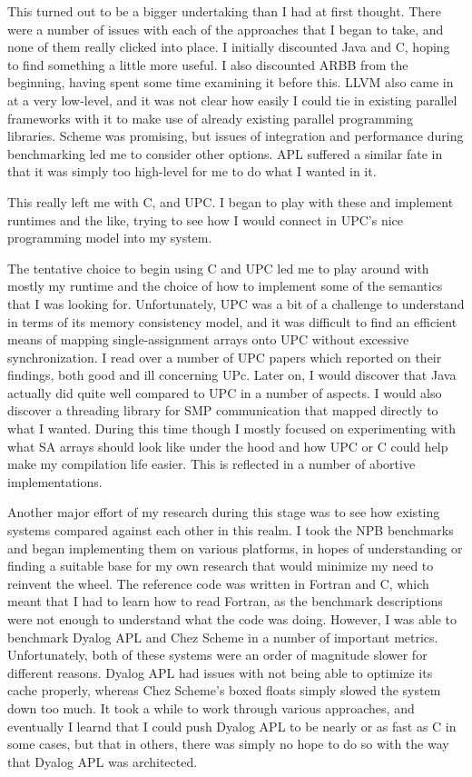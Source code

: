This turned out to be a bigger undertaking than I had at first thought.
There were a number of issues with each of the approaches that I began 
to take, and none of them really clicked into place. I initially discounted 
Java and C, hoping to find something a little more useful. I also 
discounted ARBB from the beginning, having spent some time examining it 
before this. LLVM also came in at a very low-level, and it was not 
clear how easily I could tie in existing parallel frameworks with it to 
make use of already existing parallel programming libraries. Scheme 
was promising, but issues of integration and performance during benchmarking 
led me to consider other options. APL suffered a similar fate in that it 
was simply too high-level for me to do what I wanted in it.

This really left me with C, and UPC. I began to play with these and 
implement runtimes and the like, trying to see how I would connect in 
UPC's nice programming model into my system.

The tentative choice to begin using C and UPC led me to play around with 
mostly my runtime and the choice of how to implement some of the semantics 
that I was looking for. Unfortunately, UPC was a bit of a challenge to 
understand in terms of its memory consistency model, and it was difficult 
to find an efficient means of mapping single-assignment arrays onto UPC
without excessive synchronization. I read over a number of UPC papers 
which reported on their findings, both good and ill concerning UPc.
Later on, I would discover that Java actually did quite well compared to 
UPC in a number of aspects. I would also discover a threading library 
for SMP communication that mapped directly to what I wanted.
During this time though I mostly focused on experimenting with what 
SA arrays should look like under the hood and how UPC or C could help make 
my compilation life easier. This is reflected in a number of abortive 
implementations.

Another major effort of my research during this stage was to see how existing 
systems compared against each other in this realm. I took the NPB benchmarks 
and began implementing them on various platforms, in hopes of understanding 
or finding a suitable base for my own research that would minimize my need 
to reinvent the wheel. The reference code was written in Fortran and C, 
which meant that I had to learn how to read Fortran, as the benchmark 
descriptions were not enough to understand what the code was doing. However, 
I was able to benchmark Dyalog APL and Chez Scheme in a number of important 
metrics. Unfortunately, both of these systems were an order of magnitude 
slower for different reasons. Dyalog APL had issues with not being able 
to optimize its cache properly, whereas Chez Scheme's boxed floats simply 
slowed the system down too much. It took a while to work through various 
approaches, and eventually I learnd that I could push Dyalog APL to be 
nearly or as fast as C in some cases, but that in others, there was simply 
no hope to do so with the way that Dyalog APL was architected. 

